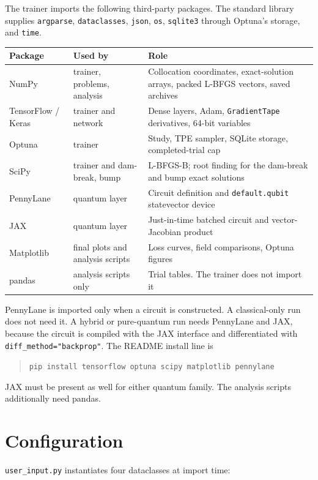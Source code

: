 \documentclass[11pt]{article}
\begin{document}
The trainer imports the following third-party packages.
The standard library supplies \texttt{argparse}, \texttt{dataclasses}, \texttt{json}, \texttt{os}, \texttt{sqlite3} through Optuna's storage, and \texttt{time}.

\begin{center}
\begin{tabular}{@{}llp{7.2cm}@{}}
\toprule
Package & Used by & Role \\
\midrule
NumPy & trainer, problems, analysis &
Collocation coordinates, exact-solution arrays, packed L-BFGS vectors, saved archives \\
TensorFlow / Keras & trainer and network &
Dense layers, Adam, \texttt{GradientTape} derivatives, 64-bit variables \\
Optuna & trainer &
Study, TPE sampler, SQLite storage, completed-trial cap \\
SciPy & trainer and dam-break, bump &
L-BFGS-B; root finding for the dam-break and bump exact solutions \\
PennyLane & quantum layer &
Circuit definition and \texttt{default.qubit} statevector device \\
JAX & quantum layer &
Just-in-time batched circuit and vector-Jacobian product \\
Matplotlib & final plots and analysis scripts &
Loss curves, field comparisons, Optuna figures \\
pandas & analysis scripts only &
Trial tables. The trainer does not import it \\
\bottomrule
\end{tabular}
\end{center}

PennyLane is imported only when a circuit is constructed.
A classical-only run does not need it.
A hybrid or pure-quantum run needs PennyLane and JAX, because the circuit is compiled with the JAX interface and differentiated with \texttt{diff\_method="backprop"}.
The README install line is
\begin{quote}
\texttt{pip install tensorflow optuna scipy matplotlib pennylane}
\end{quote}
JAX must be present as well for either quantum family.
The analysis scripts additionally need pandas.

\section{Configuration}

\texttt{user\_input.py} instantiates four dataclasses at import time:
\end{document}
